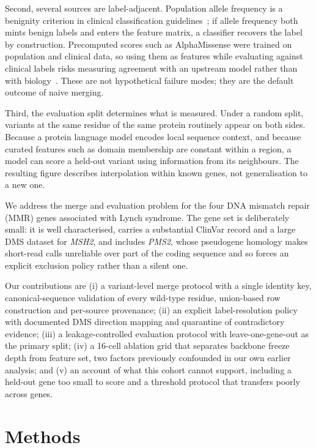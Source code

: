 \documentclass{bioinfo}
\newcommand{\gene}[1]{\textit{#1}}
\begin{document}
Second, several sources are label-adjacent. Population allele frequency is a
benignity criterion in clinical classification guidelines~\cite{richards2015acmg};
if allele frequency both mints benign labels and enters the feature matrix, a
classifier recovers the label by construction. Precomputed scores such as
AlphaMissense were trained on population and clinical data, so using them as
features while evaluating against clinical labels risks measuring agreement
with an upstream model rather than with biology~\cite{grimm2015circularity}. These are not hypothetical
failure modes; they are the default outcome of naive merging.

Third, the evaluation split determines what is measured. Under a random split,
variants at the same residue of the same protein routinely appear on both
sides. Because a protein language model encodes local sequence context, and
because curated features such as domain membership are constant within a
region, a model can score a held-out variant using information from its
neighbours. The resulting figure describes interpolation within known genes,
not generalisation to a new one.

We address the merge and evaluation problem for the four DNA mismatch repair
(MMR) genes associated with Lynch syndrome. The gene set is deliberately small:
it is well characterised, carries a substantial ClinVar record and a large DMS
dataset for \gene{MSH2}, and includes \gene{PMS2}, whose pseudogene homology
makes short-read calls unreliable over part of the coding sequence and so
forces an explicit exclusion policy rather than a silent one.

Our contributions are (i) a variant-level merge protocol with a single identity
key, canonical-sequence validation of every wild-type residue, union-based row
construction and per-source provenance; (ii) an explicit label-resolution policy
with documented DMS direction mapping and quarantine of contradictory evidence;
(iii) a leakage-controlled evaluation protocol with leave-one-gene-out as the
primary split; (iv) a 16-cell ablation grid that separates backbone freeze depth
from feature set, two factors previously confounded in our own earlier analysis;
and (v) an account of what this cohort cannot support, including a held-out gene
too small to score and a threshold protocol that transfers poorly across genes.

\section{Methods}
\label{sec:methods}
\end{document}
